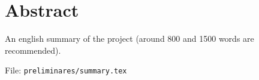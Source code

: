 %

\chapter{Abstract}

An english summary of the project (around 800 and 1500 words are recommended).

File: \texttt{preliminares/summary.tex}


\endinput

